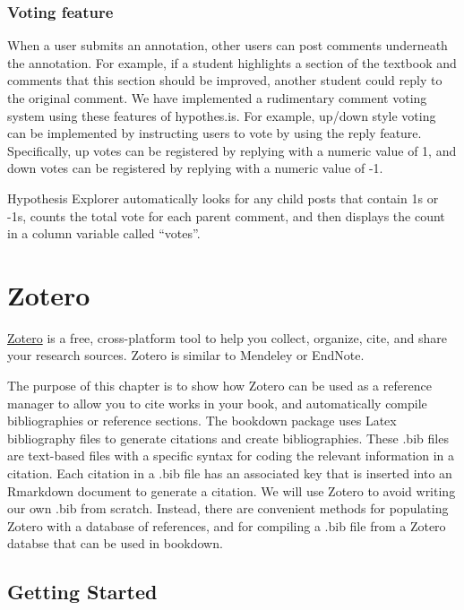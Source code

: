 \documentclass[]{book}
\begin{document}
\subsection{Voting feature}\label{voting-feature}

When a user submits an annotation, other users can post comments
underneath the annotation. For example, if a student highlights a
section of the textbook and comments that this section should be
improved, another student could reply to the original comment. We have
implemented a rudimentary comment voting system using these features of
hypothes.is. For example, up/down style voting can be implemented by
instructing users to vote by using the reply feature. Specifically, up
votes can be registered by replying with a numeric value of 1, and down
votes can be registered by replying with a numeric value of -1.

Hypothesis Explorer automatically looks for any child posts that contain
1s or -1s, counts the total vote for each parent comment, and then
displays the count in a column variable called ``votes''.

\chapter{Zotero}\label{zotero}

\href{https://www.zotero.org}{Zotero} is a free, cross-platform tool to
help you collect, organize, cite, and share your research sources.
Zotero is similar to Mendeley or EndNote.

The purpose of this chapter is to show how Zotero can be used as a
reference manager to allow you to cite works in your book, and
automatically compile bibliographies or reference sections. The bookdown
package uses Latex bibliography files to generate citations and create
bibliographies. These .bib files are text-based files with a specific
syntax for coding the relevant information in a citation. Each citation
in a .bib file has an associated key that is inserted into an Rmarkdown
document to generate a citation. We will use Zotero to avoid writing our
own .bib from scratch. Instead, there are convenient methods for
populating Zotero with a database of references, and for compiling a
.bib file from a Zotero databse that can be used in bookdown.

\section{Getting Started}\label{getting-started-1}
\end{document}
